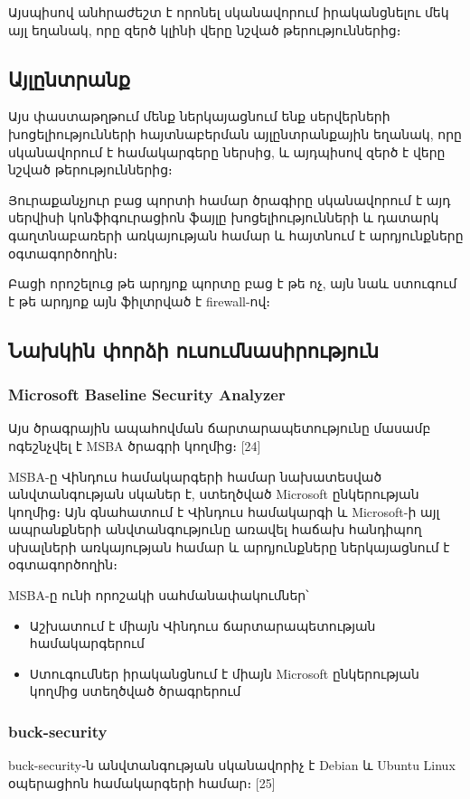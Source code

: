 \documentclass[a4paper,12pt]{article}
\begin{document}
\begin{sloppypar}
Այսպիսով անհրաժեշտ է որոնել սկանավորում իրականցնելու մեկ այլ եղանակ,
որը զերծ կլինի վերը նշված թերություններից։


\subsection{Այլընտրանք}


Այս փաստաթղթում մենք ներկայացնում ենք սերվերների խոցելիությունների
հայտնաբերման այլընտրանքային եղանակ, որը սկանավորում է համակարգերը
ներսից, և այդպիսով զերծ է վերը նշված թերություններից։

Յուրաքանչյուր բաց պորտի համար ծրագիրը սկանավորում է այդ սերվիսի
կոնֆիգուրացիոն ֆայլը խոցելիությունների և դատարկ գաղտնաբառերի
առկայության համար և հայտնում է արդյունքները օգտագործողին։

Բացի որոշելուց թե արդյոք պորտը բաց է թե ոչ, այն նաև ստուգում է
թե արդյոք այն ֆիլտրված է firewall-ով։


\subsection{Նախկին փորձի ուսումնասիրություն}


\subsubsection{Microsoft Baseline Security Analyzer}


Այս ծրագրային ապահովման ճարտարապետությունը մասամբ ոգեշնչվել է
MSBA ծրագրի կողմից։ [24]

MSBA-ը Վինդուս համակարգերի համար նախատեսված անվտանգության սկաներ է,
ստեղծված Microsoft ընկերության կողմից։ Այն գնահատում է Վինդուս
համակարգի և Microsoft-ի այլ ապրանքների անվտանգությունը առավել
հաճախ հանդիպող սխալների առկայության համար և արդյունքները 
ներկայացնում է օգտագործողին։

MSBA-ը ունի որոշակի սահմանափակումներ՝
\begin{itemize}
\item Աշխատում է միայն Վինդուս ճարտարապետության համակարգերում
\item Ստուգումներ իրականցնում է միայն Microsoft ընկերության
	կողմից ստեղծված ծրագրերում
\end{itemize}


\subsubsection{buck-security}


buck-security֊ն անվտանգության սկանավորիչ է Debian և Ubuntu Linux
օպերացիոն համակարգերի համար։ [25]


\end{sloppypar}
\end{document}
